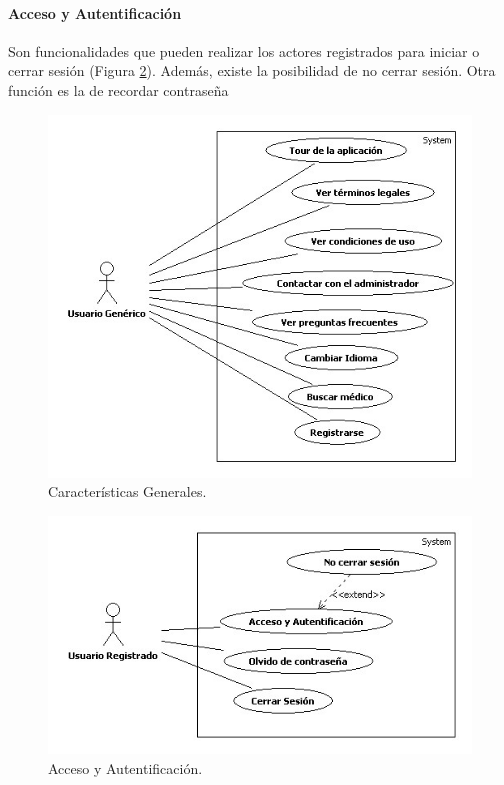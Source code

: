 \documentclass[a4paper,oneside,11pt]{book}
\begin{document}
		
			\paragraph{Acceso y Autentificación} %
			\label{par:acceso_y_autentificacion}
				Son funcionalidades que pueden realizar los actores registrados para iniciar o cerrar sesión (Figura \ref{fig:acceso}). Además, existe la posibilidad de no cerrar sesión. Otra función es la de recordar contraseña
				\begin{figure}[H]
				  \centering
				    \includegraphics[width=12cm]{img/jpg/casos_uso/Generales.jpg}
				  \caption{Características Generales.}
				  \label{fig:caracteristicas}
				\end{figure}
				
				\begin{figure}[H]
				  \centering
				    \includegraphics[width=12cm]{img/jpg/casos_uso/Acceso_y_Autentificacion.jpg}
				  \caption{Acceso y Autentificación.}
				  \label{fig:acceso}
				\end{figure}
			
\end{document}
